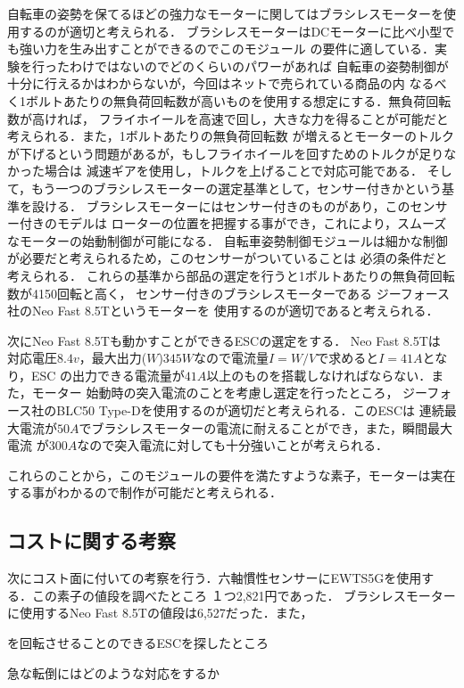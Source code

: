 \documentclass[uplatex,dvipdfmx]{jsarticle}
\begin{document}
自転車の姿勢を保てるほどの強力なモーターに関してはブラシレスモーターを使用するのが適切と考えられる．
ブラシレスモーターはDCモーターに比べ小型でも強い力を生み出すことができるのでこのモジュール
の要件に適している．実験を行ったわけではないのでどのくらいのパワーがあれば
自転車の姿勢制御が十分に行えるかはわからないが，今回はネットで売られている商品の内
なるべく1ボルトあたりの無負荷回転数が高いものを使用する想定にする．無負荷回転数が高ければ，
フライホイールを高速で回し，大きな力を得ることが可能だと考えられる．また，1ボルトあたりの無負荷回転数
が増えるとモーターのトルクが下げるという問題があるが，もしフライホイールを回すためのトルクが足りなかった場合は
減速ギアを使用し，トルクを上げることで対応可能である．
そして，もう一つのブラシレスモーターの選定基準として，センサー付きかという基準を設ける．
ブラシレスモーターにはセンサー付きのものがあり，このセンサー付きのモデルは
ローターの位置を把握する事ができ，これにより，スムーズなモーターの始動制御が可能になる．
自転車姿勢制御モジュールは細かな制御が必要だと考えられるため，このセンサーがついていることは
必須の条件だと考えられる．
これらの基準から部品の選定を行うと1ボルトあたりの無負荷回転数が4150回転と高く，
センサー付きのブラシレスモーターである
ジーフォース社のNeo Fast 8.5Tというモーターを
使用するのが適切であると考えられる．


次にNeo Fast 8.5Tも動かすことができるESCの選定をする．
Neo Fast 8.5Tは
対応電圧$8.4v$，最大出力($W$)$345W$なので電流量$I=W/V$で求めると$I=41A$となり，ESC
の出力できる電流量が$41A$以上のものを搭載しなければならない．また，モーター
始動時の突入電流のことを考慮し選定を行ったところ，
ジーフォース社のBLC50 Type-Dを使用するのが適切だと考えられる．このESCは
連続最大電流が$50A$でブラシレスモーターの電流に耐えることができ，また，瞬間最大電流
が$300A$なので突入電流に対しても十分強いことが考えられる．

これらのことから，このモジュールの要件を満たすような素子，モーターは実在
する事がわかるので制作が可能だと考えられる．


\subsection{コストに関する考察}

次にコスト面に付いての考察を行う．六軸慣性センサーにEWTS5Gを使用する．この素子の値段を調べたところ
１つ2,821円であった．
ブラシレスモーターに使用するNeo Fast 8.5Tの値段は6,527だった．また，

を回転させることのできるESCを探したところ


急な転倒にはどのような対応をするか
\end{document}
